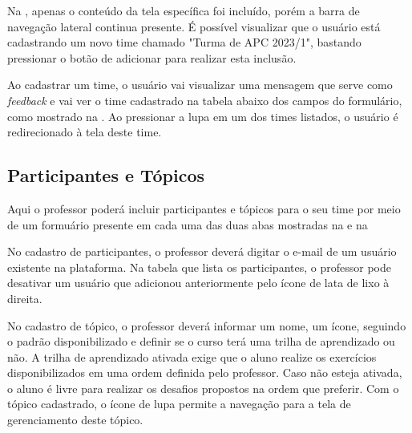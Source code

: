 
Na , apenas o conteúdo da tela específica foi incluído, porém a barra de navegação lateral continua presente. É possível visualizar que o usuário está cadastrando um novo time chamado "Turma de APC 2023/1", bastando pressionar o botão de adicionar para realizar esta inclusão.


Ao cadastrar um time, o usuário vai visualizar uma mensagem que serve como \textit{feedback} e vai ver o time cadastrado na tabela abaixo dos campos do formulário, como mostrado na . Ao pressionar a lupa em um dos times listados, o usuário é redirecionado à tela deste time.

\subsection{Participantes e Tópicos}

Aqui o professor poderá incluir participantes e tópicos para o seu time por meio de um formuário presente em cada uma das duas abas mostradas na  e na  


No cadastro de participantes, o professor deverá digitar o e-mail de um usuário existente na plataforma. Na tabela que lista os participantes, o professor pode desativar um usuário que adicionou anteriormente pelo ícone de lata de lixo à direita.


No cadastro de tópico, o professor deverá informar um nome, um ícone, seguindo o padrão disponibilizado e definir se o curso terá uma trilha de aprendizado ou não. A trilha de aprendizado ativada exige que o aluno realize os exercícios disponibilizados em uma ordem definida pelo professor. Caso não esteja ativada, o aluno é livre para realizar os desafios propostos na ordem que preferir. Com o tópico cadastrado, o ícone de lupa permite a navegação para a tela de gerenciamento deste tópico.

